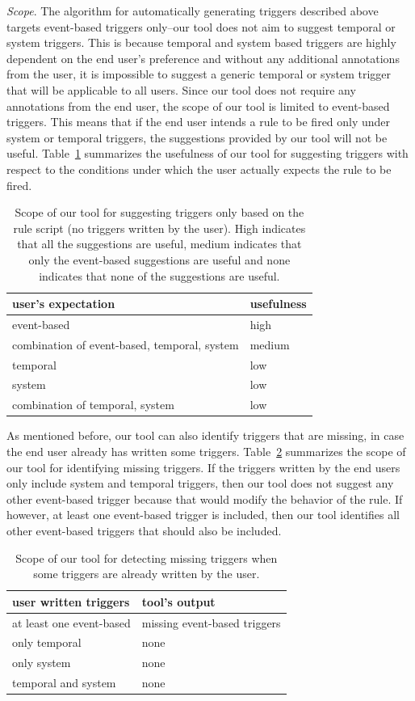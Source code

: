 \documentclass{sig-alternate-05-2015}
\begin{document}
\emph{Scope}. The algorithm for automatically generating triggers described above targets event-based triggers only--our tool does not aim to suggest temporal or system triggers. This is because temporal and system based triggers are highly dependent on the end user's preference and without any additional annotations from the user, it is impossible to suggest a generic temporal or system trigger that will be applicable to all users. Since our tool does not require any annotations from the end user, the scope of our tool is limited to event-based triggers. This means that if the end user intends a rule to be fired only under system or temporal triggers, the suggestions provided by our tool will not be useful. Table~\ref{tab:scope1} summarizes the usefulness of our tool for suggesting triggers with respect to the conditions under which the user actually expects the rule to be fired.
\begin{table}[h]
\centering
\begin{tabular}{|l|l|}
\hline
user's expectation & usefulness \\ \hline
event-based & high \\ \hline
combination of event-based, temporal, system  & medium \\ \hline
temporal & low \\\hline
system & low \\ \hline
combination of temporal, system & low  \\ \hline
\end{tabular}
\caption{Scope of our tool for suggesting triggers only based on the rule script (no triggers written by the user). High indicates that all the suggestions are useful, medium indicates that only the event-based suggestions are useful and none indicates that none of the suggestions are useful. }
\label{tab:scope1}
\end{table}

As mentioned before, our tool can also identify triggers that are missing, in case the end user already has written some triggers. Table~\ref{tab:scope2} summarizes the scope of our tool for identifying missing triggers. If the triggers written by the end users only include system and temporal triggers, then our tool does not suggest any other event-based trigger because that would modify the behavior of the rule. If however, at least one event-based trigger is included, then our tool identifies all other event-based triggers that should also be included. 
\begin{table}[h]
\centering
\begin{tabular}{|l|l|}
\hline
user written triggers & tool's output \\ \hline
at least one event-based & missing event-based triggers \\ \hline
only temporal & none \\\hline
only system & none \\ \hline
temporal and system & none  \\ \hline
\end{tabular}
\caption{Scope of our tool for detecting missing triggers when some triggers are already written by the user.}
\label{tab:scope2}
\end{table}
\end{document}
